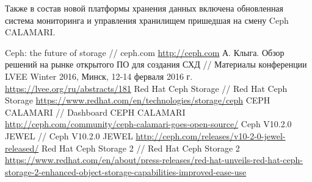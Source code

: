 \documentclass[10pt, a5paper]{article}
\begin{document}
Также в состав новой платформы хранения данных включена обновленная система мониторинга и управления хранилищем пришедшая на смену Ceph CALAMARI.

\begin{thebibliography}{99}
 Ceph: the future of storage // ceph.com \url{http://ceph.com} 
 А. Клыга. Обзор решений на рынке открытого ПО для создания СХД // Материалы конференции LVEE Winter 2016, Минск, 12-14 ферваля 2016 г. \url{https://lvee.org/ru/abstracts/181}
 Red Hat Ceph Storage // Red Hat Ceph Storage \url{https://www.redhat.com/en/technologies/storage/ceph}
 CEPH CALAMARI // Dashboard CEPH CALAMARI \url{http://ceph.com/community/ceph-calamari-goes-open-source/}
 Ceph V10.2.0 JEWEL // Ceph V10.2.0 JEWEL \url{http://ceph.com/releases/v10-2-0-jewel-released/}
 Red Hat Ceph Storage 2 // Red Hat Ceph Storage 2 \url{https://www.redhat.com/en/about/press-releases/red-hat-unveils-red-hat-ceph-storage-2-enhanced-}\linebreak\url{object-storage-capabilities-improved-ease-use}
\end{thebibliography}
\end{document}
